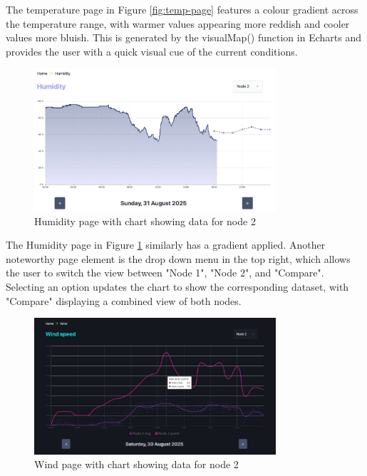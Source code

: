 The temperature page in Figure \ref{fig:temp-page} features a colour gradient
across the temperature range, with warmer values appearing more reddish and
cooler values more bluish. This is generated by the visualMap() function in
Echarts and provides the user with a quick visual cue of the current conditions.

\begin{figure}[H]
    \centering
    \includegraphics[width=0.8\textwidth]{contents/part-3/fig3/humidity-node-two.jpg}
    \caption{Humidity page with chart showing data for node 2}
    \label{fig:humidity-page}
\end{figure}

The Humidity page in Figure \ref{fig:humidity-page} similarly has a gradient
applied. Another noteworthy page element is the drop down menu in the top right,
which allows the user to switch the view between "Node 1", "Node 2", and
"Compare". Selecting an option updates the chart to show the corresponding
dataset, with "Compare" displaying a combined view of both nodes.

\begin{figure}[H]
    \centering
    \includegraphics[width=0.8\textwidth]{contents/part-3/fig3/wind-speed-tooltip.jpg}
    \caption{Wind page with chart showing data for node 2}
    \label{fig:wind-page}
\end{figure}

